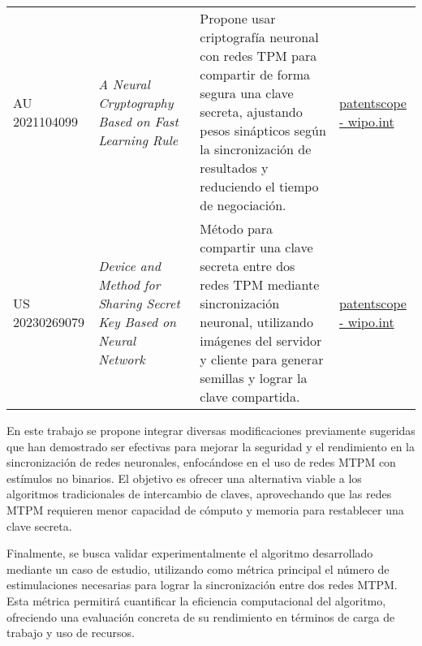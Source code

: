 \begin{longtable}{@{}p{2.5cm}p{3.5cm}p{6cm}p{2.5cm}@{}}
    AU 2021104099 & \textit{A Neural Cryptography Based on Fast Learning Rule} & Propone usar criptografía neuronal con redes TPM para compartir de forma segura una clave secreta, ajustando pesos sinápticos según la sincronización de resultados y reduciendo el tiempo de negociación. & \href{https://patentscope.wipo.int/search/en/detail.jsf?docId=AU333401020&_cid=P21-LJA6AR-24417-1}{patentscope - wipo.int} \\
    
    US 20230269079 & \textit{Device and Method for Sharing Secret Key Based on Neural Network} & Método para compartir una clave secreta entre dos redes TPM mediante sincronización neuronal, utilizando imágenes del servidor y cliente para generar semillas y lograr la clave compartida. & \href{https://patentscope.wipo.int/search/en/detail.jsf?docId=US405665557&_cid=P10-LM0QCA-59456-1}{patentscope - wipo.int} \\

\end{longtable}

En este trabajo se propone integrar diversas modificaciones previamente sugeridas que han demostrado ser efectivas para mejorar la seguridad y el rendimiento en la sincronización de redes neuronales, enfocándose en el uso de redes MTPM con estímulos no binarios. El objetivo es ofrecer una alternativa viable a los algoritmos tradicionales de intercambio de claves, aprovechando que las redes MTPM requieren menor capacidad de cómputo y memoria para restablecer una clave secreta.

Finalmente, se busca validar experimentalmente el algoritmo desarrollado mediante un caso de estudio, utilizando como métrica principal el número de estimulaciones necesarias para lograr la sincronización entre dos redes MTPM. Esta métrica permitirá cuantificar la eficiencia computacional del algoritmo, ofreciendo una evaluación concreta de su rendimiento en términos de carga de trabajo y uso de recursos.

